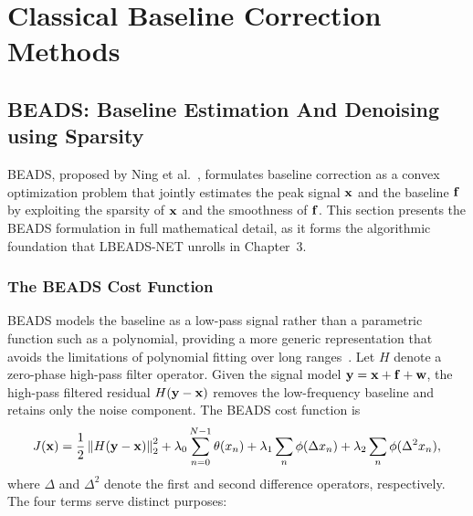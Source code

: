 \section{Classical Baseline Correction Methods}
\label{sec:bg_classical}

\subsection{BEADS: Baseline Estimation And Denoising using Sparsity}
\label{sec:bg_beads}

BEADS, proposed by Ning et al.~\cite{ning2014beads}, formulates baseline correction as a convex optimization problem that jointly estimates the peak signal $\mathbf{x}$ and the baseline $\mathbf{f}$ by exploiting the sparsity of $\mathbf{x}$ and the smoothness of $\mathbf{f}$. This section presents the BEADS formulation in full mathematical detail, as it forms the algorithmic foundation that LBEADS-NET unrolls in Chapter~3.

\subsubsection{The BEADS Cost Function}

BEADS models the baseline as a low-pass signal rather than a parametric function such as a polynomial, providing a more generic representation that avoids the limitations of polynomial fitting over long ranges~\cite{ning2014beads}. Let $H$ denote a zero-phase high-pass filter operator. Given the signal model $\mathbf{y} = \mathbf{x} + \mathbf{f} + \mathbf{w}$, the high-pass filtered residual $H(\mathbf{y} - \mathbf{x})$ removes the low-frequency baseline and retains only the noise component. The BEADS cost function is
\begin{equation}
    J(\mathbf{x}) = \frac{1}{2} \left\lVert H(\mathbf{y} - \mathbf{x}) \right\rVert_2^2
    + \lambda_0 \sum_{n=0}^{N-1} \theta(x_n)
    + \lambda_1 \sum_{n} \phi(\Delta x_n)
    + \lambda_2 \sum_{n} \phi(\Delta^2 x_n),
    \label{eq:beads_cost}
\end{equation}
where $\Delta$ and $\Delta^2$ denote the first and second difference operators, respectively. The four terms serve distinct purposes:

